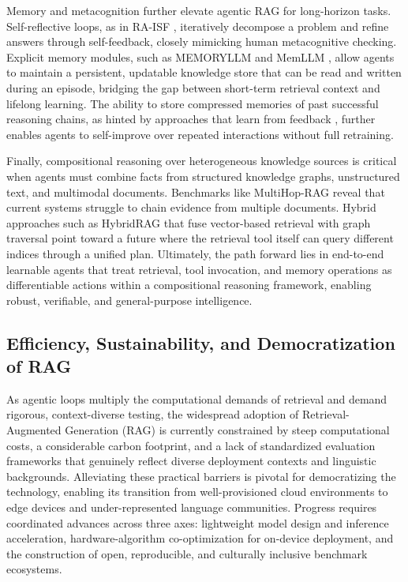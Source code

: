 \documentclass[11pt,a4paper]{article}
\begin{document}
Memory and metacognition further elevate agentic RAG for long-horizon tasks. Self-reflective loops, as in RA-ISF \cite{arxiv:2403.06840v1}, iteratively decompose a problem and refine answers through self-feedback, closely mimicking human metacognitive checking. Explicit memory modules, such as MEMORYLLM \cite{arxiv:2402.04624v1} and MemLLM \cite{arxiv:2404.11672v1}, allow agents to maintain a persistent, updatable knowledge store that can be read and written during an episode, bridging the gap between short-term retrieval context and lifelong learning. The ability to store compressed memories of past successful reasoning chains, as hinted by approaches that learn from feedback \cite{arxiv:2112.09737v2,arxiv:2206.06520v1}, further enables agents to self-improve over repeated interactions without full retraining.

Finally, compositional reasoning over heterogeneous knowledge sources is critical when agents must combine facts from structured knowledge graphs, unstructured text, and multimodal documents. Benchmarks like MultiHop-RAG \cite{arxiv:2401.15391v1} reveal that current systems struggle to chain evidence from multiple documents. Hybrid approaches such as HybridRAG \cite{arxiv:2408.04948v1} that fuse vector-based retrieval with graph traversal point toward a future where the retrieval tool itself can query different indices through a unified plan. Ultimately, the path forward lies in end-to-end learnable agents that treat retrieval, tool invocation, and memory operations as differentiable actions within a compositional reasoning framework, enabling robust, verifiable, and general-purpose intelligence.


\subsection{Efficiency, Sustainability, and Democratization of RAG}


As agentic loops multiply the computational demands of retrieval and demand rigorous, context-diverse testing, the widespread adoption of Retrieval-Augmented Generation (RAG) is currently constrained by steep computational costs, a considerable carbon footprint, and a lack of standardized evaluation frameworks that genuinely reflect diverse deployment contexts and linguistic backgrounds. Alleviating these practical barriers is pivotal for democratizing the technology, enabling its transition from well-provisioned cloud environments to edge devices and under-represented language communities. Progress requires coordinated advances across three axes: lightweight model design and inference acceleration, hardware-algorithm co-optimization for on-device deployment, and the construction of open, reproducible, and culturally inclusive benchmark ecosystems.
\end{document}
